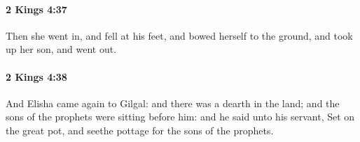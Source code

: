 		\paragraph{2 Kings 4:37} %
			\label{2KINGS-4-37}

			Then she went in, and fell at his feet, and bowed herself to the ground, and took up her son, and went out.


		\paragraph{2 Kings 4:38} %
			\label{2KINGS-4-38}

			And Elisha came again to Gilgal: and there was a dearth in the land; and the sons of the prophets were sitting before him: and he said unto his servant, Set on the great pot, and seethe pottage for the sons of the prophets.


